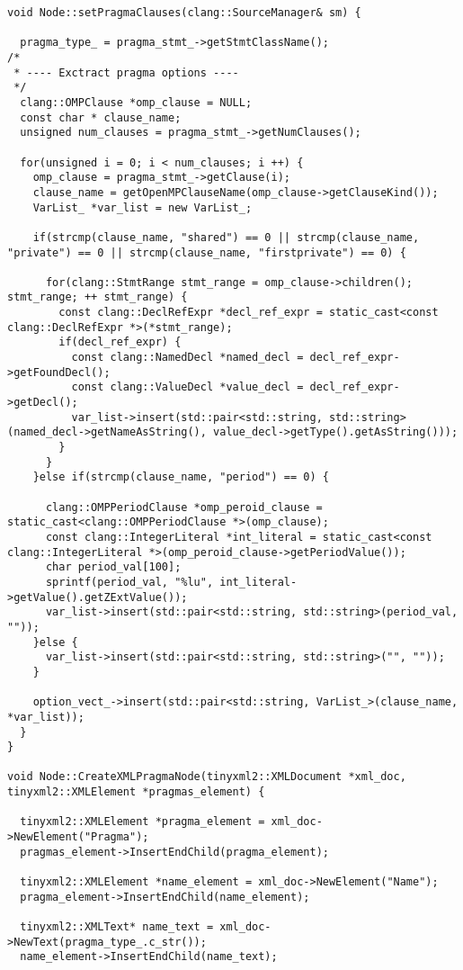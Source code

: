 \documentclass[a4paper,11pt,twoside]{book}
\begin{document}
\begin{lstlisting}[language=CCC, caption=pragma\_handler/Node.cpp]
void Node::setPragmaClauses(clang::SourceManager& sm) {
  
  pragma_type_ = pragma_stmt_->getStmtClassName();
/*
 * ---- Exctract pragma options ----
 */
  clang::OMPClause *omp_clause = NULL;
  const char * clause_name;
  unsigned num_clauses = pragma_stmt_->getNumClauses();
  
  for(unsigned i = 0; i < num_clauses; i ++) {
    omp_clause = pragma_stmt_->getClause(i);
    clause_name = getOpenMPClauseName(omp_clause->getClauseKind());
    VarList_ *var_list = new VarList_;

    if(strcmp(clause_name, "shared") == 0 || strcmp(clause_name, "private") == 0 || strcmp(clause_name, "firstprivate") == 0) {
      
      for(clang::StmtRange stmt_range = omp_clause->children(); stmt_range; ++ stmt_range) {
        const clang::DeclRefExpr *decl_ref_expr = static_cast<const clang::DeclRefExpr *>(*stmt_range);
        if(decl_ref_expr) {
          const clang::NamedDecl *named_decl = decl_ref_expr->getFoundDecl();
          const clang::ValueDecl *value_decl = decl_ref_expr->getDecl();
          var_list->insert(std::pair<std::string, std::string>(named_decl->getNameAsString(), value_decl->getType().getAsString()));
        }
      }
    }else if(strcmp(clause_name, "period") == 0) {

      clang::OMPPeriodClause *omp_peroid_clause = static_cast<clang::OMPPeriodClause *>(omp_clause);
      const clang::IntegerLiteral *int_literal = static_cast<const clang::IntegerLiteral *>(omp_peroid_clause->getPeriodValue());
      char period_val[100];
      sprintf(period_val, "%lu", int_literal->getValue().getZExtValue());
      var_list->insert(std::pair<std::string, std::string>(period_val, ""));
    }else {
      var_list->insert(std::pair<std::string, std::string>("", ""));
    }

    option_vect_->insert(std::pair<std::string, VarList_>(clause_name, *var_list));
  }
}

void Node::CreateXMLPragmaNode(tinyxml2::XMLDocument *xml_doc, tinyxml2::XMLElement *pragmas_element) {
  
  tinyxml2::XMLElement *pragma_element = xml_doc->NewElement("Pragma");
  pragmas_element->InsertEndChild(pragma_element);

  tinyxml2::XMLElement *name_element = xml_doc->NewElement("Name");
  pragma_element->InsertEndChild(name_element);
  
  tinyxml2::XMLText* name_text = xml_doc->NewText(pragma_type_.c_str());
  name_element->InsertEndChild(name_text);


\end{lstlisting}
\end{document}
